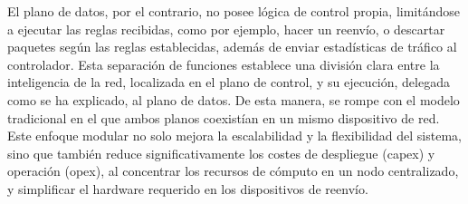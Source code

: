 El plano de datos, por el contrario, no posee lógica de control propia, limitándose a ejecutar las reglas recibidas, como por ejemplo, hacer un reenvío, o descartar paquetes según las reglas establecidas, además de  enviar estadísticas de tráfico al controlador. Esta separación de funciones establece una división clara entre la inteligencia de la red, localizada en el plano de control, y su ejecución, delegada como se ha explicado, al plano de datos. De esta manera, se rompe con el modelo tradicional en el que ambos planos coexistían en un mismo dispositivo de red. Este enfoque modular no solo mejora la escalabilidad y la flexibilidad del sistema, sino que también reduce significativamente los costes de despliegue (\gls{capex}) y operación (\gls{opex}), al concentrar los recursos de cómputo en un nodo centralizado, y simplificar el hardware requerido en los dispositivos de reenvío.\\
\\
